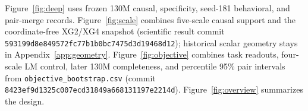 Figure~\ref{fig:deep} uses frozen 130M causal, specificity, seed-181
behavioral, and pair-merge records. Figure~\ref{fig:scale} combines
five-scale causal support and the coordinate-free XG2/XG4 snapshot
(scientific result commit
\nolinkurl{593199d8e849572fc77b1b0bc7475d3d19468d12}); historical
scalar geometry stays in Appendix~\ref{app:geometry}.
Figure~\ref{fig:objective} combines task readouts, four-scale LM control,
later 130M completeness, and percentile 95\% pair intervals from
\texttt{objective\_bootstrap.csv} (commit
\nolinkurl{8423ef9d1325c007ecd31849a668131197e2214d}).
Figure~\ref{fig:overview} summarizes the design.
